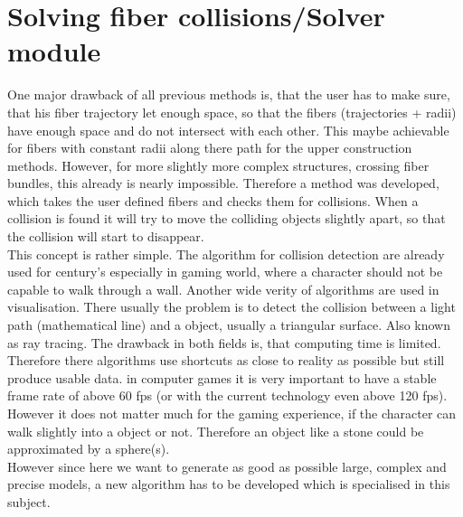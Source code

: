 \section{Solving fiber collisions/Solver module}
% 
One major drawback of all previous methods is, that the user has to make sure, that his fiber trajectory let enough space, so that the fibers (trajectories + radii) have enough space and do not intersect with each other.
This maybe achievable for fibers with constant radii along there path for the upper construction methods.
However, for more slightly more complex structures, \eg crossing fiber bundles, this already is nearly impossible.
Therefore a method was developed, which takes the user defined fibers and checks them for collisions.
When a collision is found it will try to move the colliding objects slightly apart, so that the collision will start to disappear.
\\
% 
This concept is rather simple.
The algorithm for collision detection are already used for century's especially in gaming world, where a character \eg should not be capable to walk through a wall. Another wide verity of algorithms are used in visualisation. There usually the problem is to detect the collision between a light path (mathematical line) and a object, usually a triangular surface. Also known as ray tracing.
The drawback in both fields is, that computing time is limited.
Therefore there algorithms use shortcuts as close to reality as possible but still produce usable data. \eg in computer games it is very important to have a stable frame rate of above $\num{60}$ \ac{fps} (or with the current technology even above 120 \ac{fps}).
However it does not matter much for the gaming experience, if the character can walk slightly into a object or not.
Therefore an object like a stone could be approximated by a sphere(s).
\\
%
However since here we want to generate as good as possible large, complex and precise models, a new algorithm has to be developed which is specialised in this subject.
% 
\\[\baselineskip]
%
